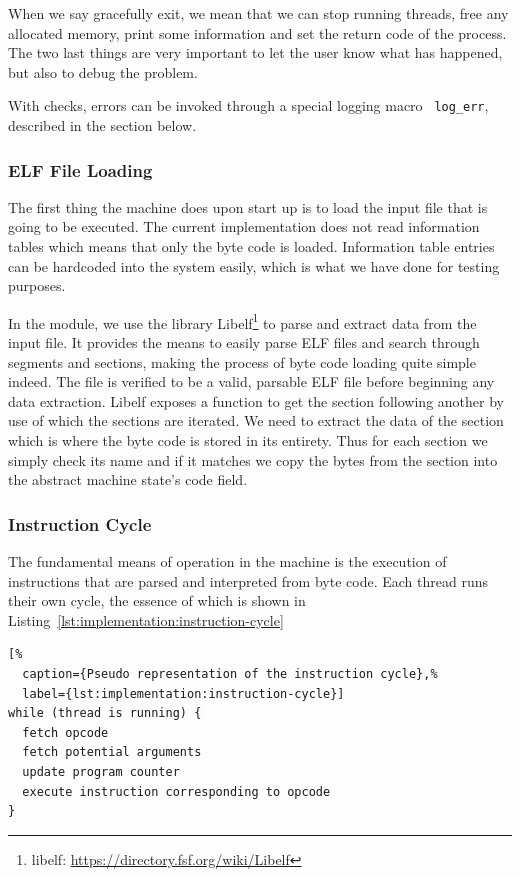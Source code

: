 When we say gracefully exit, we mean that we can stop running threads, free any
allocated memory, print some information and set the return code of the
process. The two last things are very important to let the user know what has
happened, but also to debug the problem.

With checks, errors can be invoked through a special logging macro {\tt
  log\_err}, described in the  section
below. %

\subsubsection{ELF File Loading}

The first thing the machine does upon start up is to load the input file that is
going to be executed. The current implementation does not read information
tables which means that only the byte code is loaded. Information table entries
can be hardcoded into the system easily, which is what we have done for testing
purposes.

In the  module, we use the library Libelf\footnote{libelf:
  \url{https://directory.fsf.org/wiki/Libelf}} to parse and extract data from
the input file. It provides the means to easily parse ELF files and search
through segments and sections, making the process of byte code loading quite
simple indeed. The file is verified to be a valid, parsable ELF file before
beginning any data extraction. Libelf exposes a function to get the section
following another by use of which the sections are iterated. We need to extract
the data of the  section which is where the byte code is stored in
its entirety. Thus for each section we simply check its name and if it matches
we copy the bytes from the section into the abstract machine state's code field.

\subsubsection{Instruction Cycle}

The fundamental means of operation in the machine is the execution of
instructions that are parsed and interpreted from byte code. Each thread runs
their own cycle, the essence of which is shown in
Listing~\ref{lst:implementation:instruction-cycle}

\begin{lstlisting}[%
  caption={Pseudo representation of the instruction cycle},%
  label={lst:implementation:instruction-cycle}]
while (thread is running) {
  fetch opcode
  fetch potential arguments
  update program counter
  execute instruction corresponding to opcode
}
\end{lstlisting}

